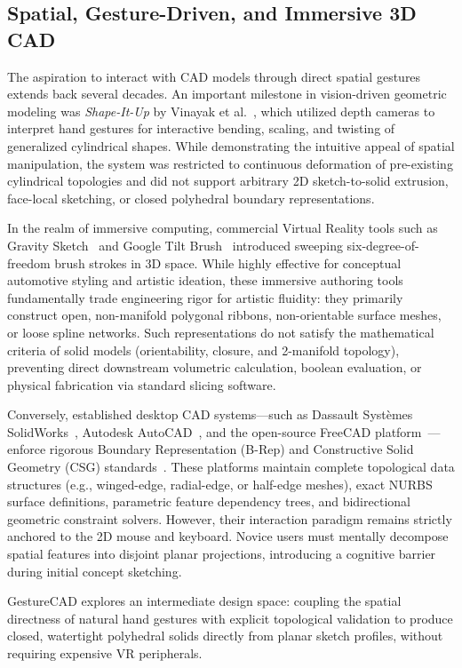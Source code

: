 \subsection{Spatial, Gesture-Driven, and Immersive 3D CAD}
The aspiration to interact with CAD models through direct spatial gestures extends back several decades. An important milestone in vision-driven geometric modeling was \textit{Shape-It-Up} by Vinayak et al.~\cite{vinayak2013shapeitup}, which utilized depth cameras to interpret hand gestures for interactive bending, scaling, and twisting of generalized cylindrical shapes. While demonstrating the intuitive appeal of spatial manipulation, the system was restricted to continuous deformation of pre-existing cylindrical topologies and did not support arbitrary 2D sketch-to-solid extrusion, face-local sketching, or closed polyhedral boundary representations.

In the realm of immersive computing, commercial Virtual Reality tools such as Gravity Sketch~\cite{gravitysketch} and Google Tilt Brush~\cite{tiltbrush} introduced sweeping six-degree-of-freedom brush strokes in 3D space. While highly effective for conceptual automotive styling and artistic ideation, these immersive authoring tools fundamentally trade engineering rigor for artistic fluidity: they primarily construct open, non-manifold polygonal ribbons, non-orientable surface meshes, or loose spline networks. Such representations do not satisfy the mathematical criteria of solid models (orientability, closure, and 2-manifold topology), preventing direct downstream volumetric calculation, boolean evaluation, or physical fabrication via standard slicing software.

Conversely, established desktop CAD systems---such as Dassault Syst\`emes SolidWorks~\cite{solidworks}, Autodesk AutoCAD~\cite{autocad}, and the open-source FreeCAD platform~\cite{freecad}---enforce rigorous Boundary Representation (B-Rep) and Constructive Solid Geometry (CSG) standards~\cite{mantyla1988,hoffmann1989geometric}. These platforms maintain complete topological data structures (e.g., winged-edge, radial-edge, or half-edge meshes), exact NURBS surface definitions, parametric feature dependency trees, and bidirectional geometric constraint solvers. However, their interaction paradigm remains strictly anchored to the 2D mouse and keyboard. Novice users must mentally decompose spatial features into disjoint planar projections, introducing a cognitive barrier during initial concept sketching. 

GestureCAD explores an intermediate design space: coupling the spatial directness of natural hand gestures with explicit topological validation to produce closed, watertight polyhedral solids directly from planar sketch profiles, without requiring expensive VR peripherals.

